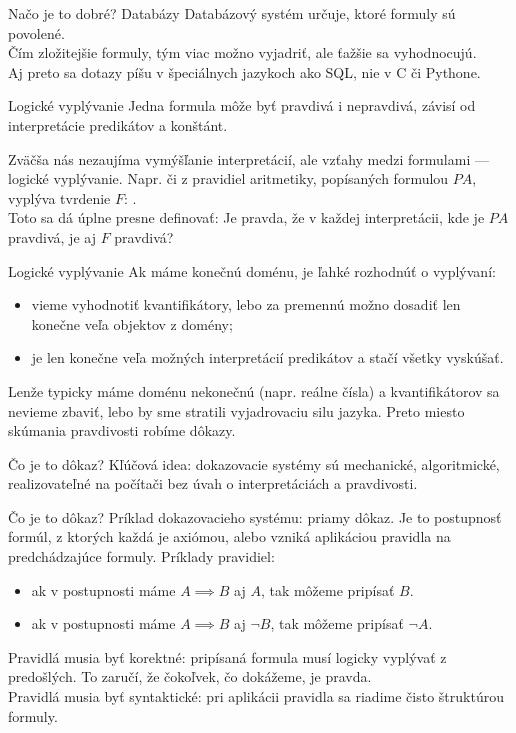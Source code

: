 \documentclass[12pt]{beamer}
\theoremstyle{definition}
\begin{document}
\begin{frame}{Načo je to dobré? Databázy}
Databázový systém určuje, ktoré formuly sú povolené.\\
Čím zložitejšie formuly, tým viac možno vyjadriť, ale ťažšie sa vyhodnocujú.\\[3mm]
Aj preto sa dotazy píšu v špeciálnych jazykoch ako SQL, nie v C či Pythone.
\end{frame}

\begin{frame}{Logické vyplývanie}
Jedna formula môže byť pravdivá i nepravdivá, závisí od interpretácie predikátov a konštánt.

Zväčša nás nezaujíma vymýšľanie interpretácií, ale vzťahy medzi formulami
--- logické vyplývanie. Napr. či z pravidiel aritmetiky, popísaných formulou $PA$, vyplýva tvrdenie $F$: .\\[2mm]

Toto sa dá úplne presne definovať:
\alert{Je pravda, že v každej interpretácii, kde je $PA$ pravdivá, je aj $F$ pravdivá?}
\end{frame}

\begin{frame}{Logické vyplývanie}
Ak máme konečnú doménu, je ľahké rozhodnúť o vyplývaní:
\begin{itemize}
\item vieme vyhodnotiť kvantifikátory, lebo za premennú možno dosadiť len konečne veľa objektov z domény;
\item je len konečne veľa možných interpretácií predikátov a stačí všetky vyskúšať.
\end{itemize}
Lenže typicky máme doménu nekonečnú (napr. reálne čísla) a kvantifikátorov sa nevieme zbaviť, lebo by sme stratili vyjadrovaciu silu jazyka. Preto miesto skúmania pravdivosti robíme dôkazy.
\end{frame}

\begin{frame}{Čo je to dôkaz?}
Kľúčová idea: dokazovacie systémy sú mechanické, algoritmické,
realizovateľné na počítači bez úvah o interpretáciách a pravdivosti.
\end{frame}

\begin{frame}{Čo je to dôkaz?}
Príklad dokazovacieho systému: \alert{priamy dôkaz}. Je to postupnosť formúl, z ktorých každá je axiómou, alebo vzniká aplikáciou pravidla na predchádzajúce formuly.
Príklady pravidiel:
\begin{itemize}
\item ak v postupnosti máme $A\implies B$ aj $A$, tak môžeme pripísať $B$.
\item ak v postupnosti máme $A\implies B$ aj $\lnot B$, tak môžeme pripísať $\lnot A$.
\end{itemize}

Pravidlá musia byť \alert{korektné}: pripísaná formula musí logicky vyplývať z predošlých. To zaručí, že čokoľvek, čo dokážeme, je pravda.\\[3mm]

Pravidlá musia byť \alert{syntaktické}: pri aplikácii pravidla sa riadime čisto štruktúrou formuly.
\end{frame}
\end{document}
